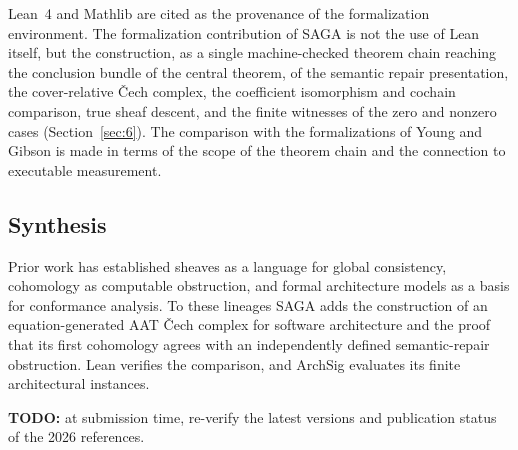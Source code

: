 Lean~4 \citep{demoura2021lean} and Mathlib \citep{mathlib2020lean} are
cited as the provenance of the formalization environment. The
formalization contribution of SAGA is not the use of Lean itself, but
the construction, as a single machine-checked theorem chain reaching
the conclusion bundle of the central theorem, of the semantic repair
presentation, the cover-relative \v{C}ech complex, the coefficient
isomorphism and cochain comparison, true sheaf descent, and the finite
witnesses of the zero and nonzero cases (Section~\ref{sec:6}). The
comparison with the formalizations of Young and Gibson is made in
terms of the scope of the theorem chain and the connection to
executable measurement.

\subsection{Synthesis}\label{sec:85}

Prior work has established sheaves as a language for global
consistency, cohomology as computable obstruction, and formal
architecture models as a basis for conformance analysis. To these
lineages SAGA adds the construction of an equation-generated AAT
\v{C}ech complex for software architecture and the proof that its
first cohomology agrees with an independently defined semantic-repair
obstruction. Lean verifies the comparison, and ArchSig evaluates its
finite architectural instances.

\textbf{TODO:} at submission time, re-verify the latest versions and
publication status of the 2026 references.
